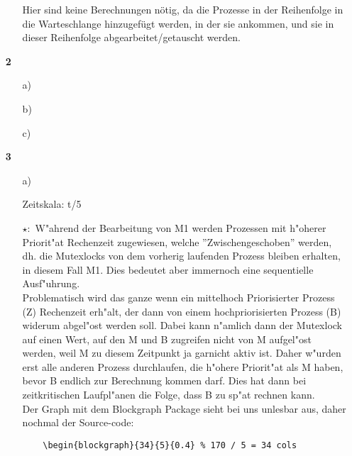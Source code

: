 \documentclass[a4paper,11pt]{article}
\begin{document}
\begin{enumerate}
\begin{itemize}
    Hier sind keine Berechnungen nötig, da die Prozesse in der Reihenfolge
    in die Warteschlange hinzugefügt werden, in der sie ankommen, und sie in
    dieser Reihenfolge abgearbeitet/getauscht werden.
\end{itemize}

\item[\textbf{2}]

\begin{itemize}
    \item[a)]

    \item[b)]

    \item[c)] 
\end{itemize}

\item[\textbf{3}]

\begin{itemize}
    \item[a)]

    Zeitskala: t/5

    \begin{figure}[h]
        \scalebox{0.4}{}
    \end{figure}


$\star :$ W"ahrend der Bearbeitung von M1 werden Prozessen mit h"oherer Priorit"at Rechenzeit zugewiesen, welche ''Zwischengeschoben'' werden, dh. die Mutexlocks von dem vorherig laufenden Prozess bleiben erhalten, in diesem Fall M1. Dies bedeutet aber immernoch eine sequentielle Ausf"uhrung.
\\

Problematisch wird das ganze wenn ein mittelhoch Priorisierter Prozess (Z) Rechenzeit erh"alt, der dann von einem hochpriorisierten Prozess (B) widerum abgel"ost werden soll. Dabei kann n"amlich dann der Mutexlock auf einen Wert, auf den M und B zugreifen nicht von M aufgel"ost werden, weil M zu diesem Zeitpunkt ja garnicht aktiv ist.
Daher w"urden erst alle anderen Prozess durchlaufen, die h"ohere Priorit"at als M haben, bevor B endlich zur Berechnung kommen darf. Dies hat dann bei zeitkritischen Laufpl"anen die Folge, dass B zu sp"at rechnen kann.
\\

Der Graph mit dem Blockgraph Package sieht bei uns unlesbar aus, daher nochmal der Source-code:

\begin{lstlisting}
    \begin{blockgraph}{34}{5}{0.4} % 170 / 5 = 34 cols


\end{lstlisting}
\end{itemize}
\end{enumerate}
\end{document}
